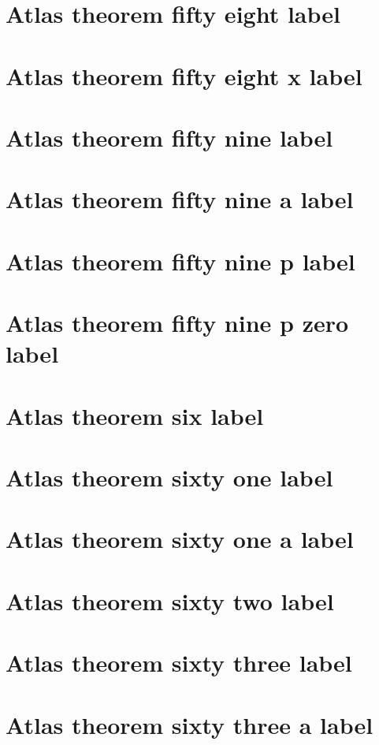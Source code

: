 \documentclass[11pt]{article}
\theoremstyle{definition}
\begin{document}
\section{Atlas theorem fifty eight label}
\label{ll:labels:atlas-t58}
\section{Atlas theorem fifty eight x label}
\label{ll:labels:atlas-t58x}
\section{Atlas theorem fifty nine label}
\label{ll:labels:atlas-t59}
\section{Atlas theorem fifty nine a label}
\label{ll:labels:atlas-t59a}
\section{Atlas theorem fifty nine p label}
\label{ll:labels:atlas-t59p}
\section{Atlas theorem fifty nine p zero label}
\label{ll:labels:atlas-t59p0}
\section{Atlas theorem six label}
\label{ll:labels:atlas-t6}
\section{Atlas theorem sixty one label}
\label{ll:labels:atlas-t61}
\section{Atlas theorem sixty one a label}
\label{ll:labels:atlas-t61a}
\section{Atlas theorem sixty two label}
\label{ll:labels:atlas-t62}
\section{Atlas theorem sixty three label}
\label{ll:labels:atlas-t63}
\section{Atlas theorem sixty three a label}
\label{ll:labels:atlas-t63a}
\end{document}
